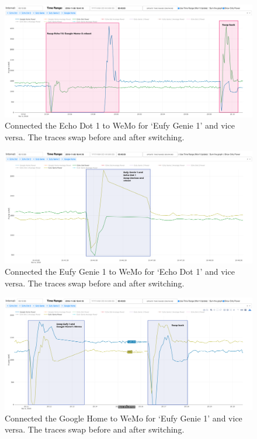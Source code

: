 \begin{figure}[H]
    \centering
    \includegraphics[width=1\textwidth]{figures/swapEcho1Home.png}
    \caption{Connected the Echo Dot 1 to WeMo for `Eufy Genie 1' and vice versa. The traces swap before and after switching.}
    \label{fig:swapEcho1Home}
\end{figure}

\begin{figure}[H]
    \centering
    \includegraphics[width=1\textwidth]{figures/swapEufy1Echo1.png}
    \caption{Connected the Eufy Genie 1 to WeMo for `Echo Dot 1' and vice versa. The traces swap before and after switching.}
    \label{fig:swapEufy1Echo1}
\end{figure}

\begin{figure}[H]
    \centering
    \includegraphics[width=1\textwidth]{figures/swapEufy1Home.png}
    \caption{Connected the Google Home to WeMo for `Eufy Genie 1' and vice versa. The traces swap before and after switching.}
    \label{fig:swapEufy1Home}
\end{figure}

